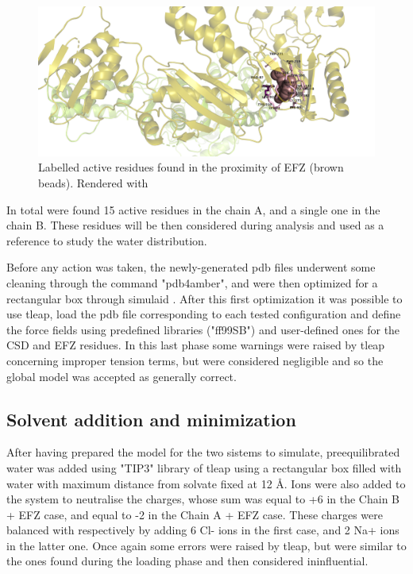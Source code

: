 \documentclass[12pt]{article}
\begin{document}
\begin{figure}
    \centering
    \includegraphics[width=\textwidth]{../figures/act_res.png}
    \caption{Labelled active residues found in the proximity of EFZ (brown beads). Rendered with \cite[Pymol]{pymol} \label{fig:actres}}
\end{figure}
In total were found 15 active residues in the chain A, and a single one in the chain B. These residues will be then considered during
analysis and used as a reference to study the water distribution.

Before any action was taken, the newly-generated pdb files underwent some cleaning through the command "pdb4amber", and were then optimized for a rectangular box through simulaid \cite{simulaid}. After this first optimization it was possible to use tleap, load the pdb file corresponding to each tested configuration and define the force fields using predefined libraries ("ff99SB") and user-defined ones for the CSD and EFZ residues. In this last phase some warnings were raised by tleap concerning improper tension terms, but were considered negligible and so the global model was accepted as generally correct.

\subsection{Solvent addition and minimization}
After having prepared the model for the two sistems to simulate, preequilibrated water was added using "TIP3" library of tleap using a rectangular box filled with water with maximum distance from solvate fixed at 12 \AA. Ions were also added to the system to neutralise the charges, whose sum was equal to +6 in the Chain B + EFZ case, and equal to -2 in the Chain A + EFZ case.
These charges were balanced with respectively by adding 6 Cl- ions in the first case, and 2 Na+ ions in the latter one. Once again some errors were raised by tleap, but were similar to the ones found during the loading phase and then considered ininfluential.
\end{document}
